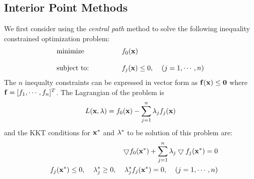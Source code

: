 \usepackage{amssymb}
\usepackage{html,makeidx}



\subsection*{Interior Point Methods}

We first consider using the {\em central path} method to solve 
the following inequality constrained optimization problem:
\begin{equation}
  \begin{array}{ll}
    \mbox{minimize}  &  f_0({\bf x})\\
    \;\;\;\;\;\;\;\;\;\;\;\;\;\;\;\;\;\;\;\;\;\;\;\;\;\;\;\;\;\;\\
    \mbox{subject to:} & f_j({\bf x})\le 0,\;\;\;\;(j=1,\cdots,n)
  \end{array}
\end{equation}
The $n$ inequalty constraints can be expressed in vector form as
${\bf f}({\bf x})\le{\bf 0}$ where ${\bf f}=[f_1,\cdots,f_n]^T$. 
The Lagrangian of the problem is
\[
L({\bf x},{\bf\lambda})=f_0({\bf x})-\sum_{j=1}^n\lambda_jf_j({\bf x})
\]
and the KKT conditions for ${\bf x}^*$ and ${\bf\lambda}^*$ to be 
solution of this problem are:
\begin{eqnarray}
  &&\bigtriangledown f_0({\bf x}^*)+\sum_{j=1}^n
  \lambda_j\bigtriangledown f_j({\bf x}^*)=0
  \nonumber\\
  &&f_j({\bf x}^*)\le 0,\;\;\;\;\lambda^*_j\ge 0,\;\;\;\;
  \lambda^*_j f_j({\bf x}^*)=0,\;\;\;\;(j=1,\cdots,n)
\end{eqnarray}

